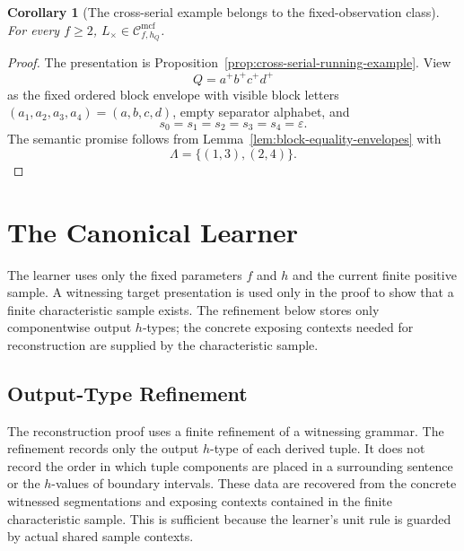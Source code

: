 \documentclass[11pt,a4paper]{article}
\newtheorem{corollary}[theorem]{Corollary}
\theoremstyle{remark}
\newcommand{\Cmcf}[2]{\mathcal{C}^{\mathrm{mcf}}_{#1,#2}}
\newcommand{\eps}{\varepsilon}
\begin{document}
\begin{corollary}[The cross-serial example belongs to the fixed-observation class]
\label{cor:cross-serial-in-fixed-observation-class}
For every \(f\ge2\), \(L_{\times}\in\Cmcf{f}{h_Q}\).
\end{corollary}

\begin{proof}
The presentation is Proposition~\ref{prop:cross-serial-running-example}.  View
\[
  Q=a^+b^+c^+d^+
\]
as the fixed ordered block envelope with visible block letters
\((a_1,a_2,a_3,a_4)=(a,b,c,d)\), empty separator alphabet, and
\[
  s_0=s_1=s_2=s_3=s_4=\eps.
\]
The semantic promise follows from
Lemma~\ref{lem:block-equality-envelopes} with
\[
  \Lambda=\{(1,3),(2,4)\}.
\]
\end{proof}


\section{The Canonical Learner}
\label{sec:learner}

The learner uses only the fixed parameters \(f\) and \(h\) and the current finite
positive sample.  A witnessing target presentation is used only in the proof to
show that a finite characteristic sample exists.  The refinement below stores
only componentwise output \(h\)-types; the concrete exposing contexts needed for
reconstruction are supplied by the characteristic sample.

\subsection{Output-Type Refinement}
\label{sec:refinement}

The reconstruction proof uses a finite refinement of a witnessing grammar.  The
refinement records only the output \(h\)-type of each derived tuple.  It does not
record the order in which tuple components are placed in a surrounding sentence
or the \(h\)-values of boundary intervals.  These data are recovered from the
concrete witnessed segmentations and exposing contexts contained in the finite
characteristic sample.  This is sufficient because the learner's unit rule is
guarded by actual shared sample contexts.
\end{document}
